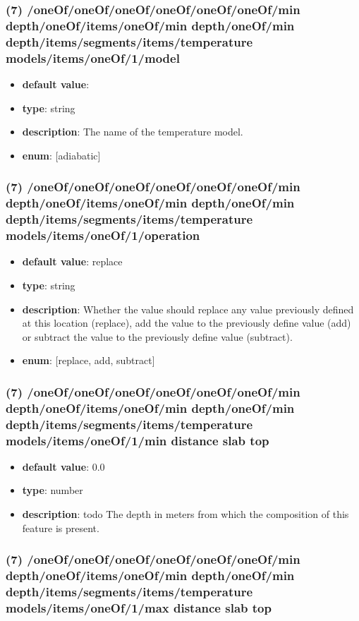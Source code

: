 \subsubsection{(7) /oneOf/oneOf/oneOf/oneOf/oneOf/oneOf/min depth/oneOf/items/oneOf/min depth/oneOf/min depth/items/segments/items/temperature models/items/oneOf/1/model}
\begin{itemize}[leftmargin=7em]\item {\bf default value}: 
\item {\bf type}: string
\item {\bf description}: The name of the temperature model.
\item {\bf enum}: [adiabatic]\end{itemize}\subsubsection{(7) /oneOf/oneOf/oneOf/oneOf/oneOf/oneOf/min depth/oneOf/items/oneOf/min depth/oneOf/min depth/items/segments/items/temperature models/items/oneOf/1/operation}
\begin{itemize}[leftmargin=7em]\item {\bf default value}: replace
\item {\bf type}: string
\item {\bf description}: Whether the value should replace any value previously defined at this location (replace), add the value to the previously define value (add) or subtract the value to the previously define value (subtract).
\item {\bf enum}: [replace, add, subtract]\end{itemize}\subsubsection{(7) /oneOf/oneOf/oneOf/oneOf/oneOf/oneOf/min depth/oneOf/items/oneOf/min depth/oneOf/min depth/items/segments/items/temperature models/items/oneOf/1/min distance slab top}
\begin{itemize}[leftmargin=7em]\item {\bf default value}: 0.0
\item {\bf type}: number
\item {\bf description}: todo The depth in meters from which the composition of this feature is present.
\end{itemize}\subsubsection{(7) /oneOf/oneOf/oneOf/oneOf/oneOf/oneOf/min depth/oneOf/items/oneOf/min depth/oneOf/min depth/items/segments/items/temperature models/items/oneOf/1/max distance slab top}
